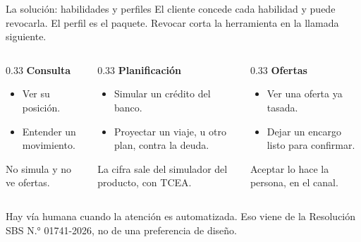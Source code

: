 \documentclass[aspectratio=169,11pt]{beamer}
\begin{document}
\begin{frame}{La solución: habilidades y perfiles}
\vspace{0.02cm}
El cliente concede cada habilidad y puede revocarla. El perfil es el paquete. Revocar corta la herramienta en la llamada siguiente.

\vspace{0.28cm}
\begin{columns}[T]
\begin{column}{0.33\textwidth}
{\color{cobre}\bfseries Consulta}
\begin{itemize}
\setlength{\itemsep}{0.12em}
  \item Ver su posición.
  \item Entender un movimiento.
\end{itemize}
\vspace{0.25cm}
{\footnotesize\color{muted} No simula y no ve ofertas.}
\end{column}
\begin{column}{0.33\textwidth}
{\color{bcp}\bfseries Planificación}
\begin{itemize}
\setlength{\itemsep}{0.12em}
  \item Simular un crédito del banco.
  \item Proyectar un viaje, u otro plan, contra la deuda.
\end{itemize}
\vspace{0.08cm}
{\footnotesize\color{muted} La cifra sale del simulador del producto, con TCEA.}
\end{column}
\begin{column}{0.33\textwidth}
{\color{cobre}\bfseries Ofertas}
\begin{itemize}
\setlength{\itemsep}{0.12em}
  \item Ver una oferta ya tasada.
  \item Dejar un encargo listo para confirmar.
\end{itemize}
\vspace{0.08cm}
{\footnotesize\color{muted} Aceptar lo hace la persona, en el canal.}
\end{column}
\end{columns}
\vspace{0.28cm}
{\small Hay vía humana cuando la atención es automatizada. Eso viene de la Resolución SBS N.° 01741-2026, no de una preferencia de diseño.}
\end{frame}
\end{document}
